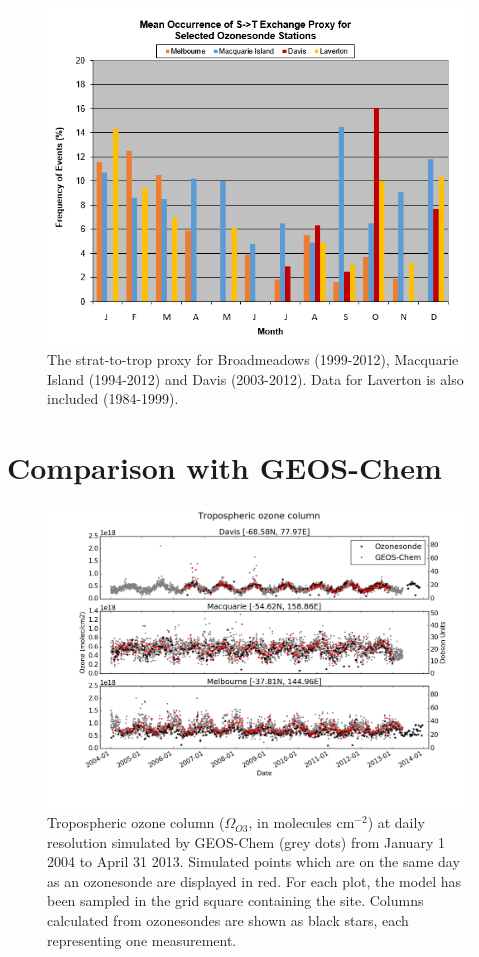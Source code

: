 \documentclass{article}
\begin{document}
  \begin{figure}[!htbp]
    \begin{center}
    \includegraphics[width=0.8\columnwidth]{figures/AndrewSTTProxy.png}
    \caption{The strat-to-trop proxy for Broadmeadows (1999-2012), Macquarie Island (1994-2012) and Davis (2003-2012).
    Data for Laverton is also included (1984-1999).}
    \label{fig:AndrewProxySTT}
    \end{center}
  \end{figure}
  

\section{Comparison with GEOS-Chem}
  
  \begin{figure}[!htbp]
    \includegraphics[width=\textwidth]{figures/StationSeries.png}
    \caption{Tropospheric ozone column ($\Omega_{O3}$, in molecules cm$^{-2}$) at daily resolution simulated by GEOS-Chem (grey dots) from January 1 2004 to April 31 2013.
    Simulated points which are on the same day as an ozonesonde are displayed in red.
    For each plot, the model has been sampled in the grid square containing the site.
    Columns calculated from ozonesondes are shown as black stars, each representing one measurement.}
    \label{fig:StationSeriesGEOSChem}
  \end{figure}
  
\end{document}
